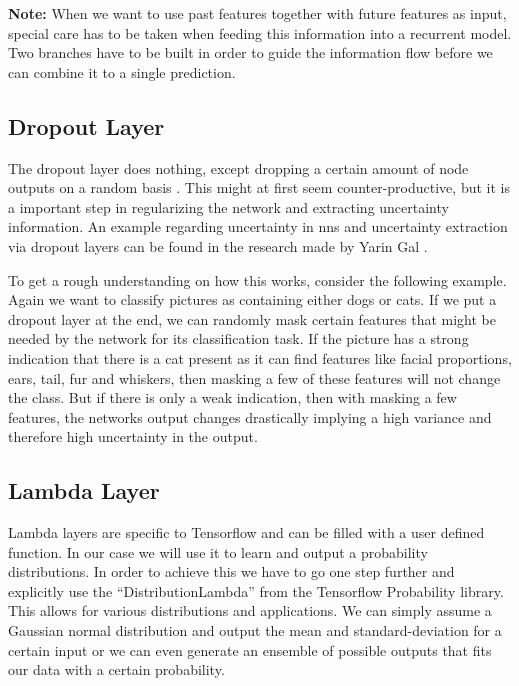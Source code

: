 	\textbf{Note:} When we want to use past features together with future features as input, special care has to be taken when feeding this information into a recurrent model. Two branches have to be built in order to guide the information flow before we can combine it to a single prediction.
	
	\subsection{Dropout Layer}
	The dropout layer does nothing, except dropping a certain amount of node outputs on a random basis \cite[p. 251f]{deep-learning}. This might at first seem counter-productive, but it is a important step in regularizing the network and extracting uncertainty information. %
	An example regarding uncertainty in \acp{nn} and uncertainty extraction via dropout layers can be found in the research made by Yarin Gal \cite{yarin-dropout} \cite{yarin-thesis}.
	
	To get a rough understanding on how this works, consider the following example. Again we want to classify pictures as containing either dogs or cats. If we put a dropout layer at the end, we can randomly mask certain features that might be needed by the network for its classification task. If the picture has a strong indication that there is a cat present as it can find features like facial proportions, ears, tail, fur and whiskers, then masking a few of these features will not change the class. But if there is only a weak indication, then with masking a few features, the networks output changes drastically implying a high variance and therefore high uncertainty in the output.
	
	\subsection{Lambda Layer}
	Lambda layers are specific to Tensorflow and can be filled with a user defined function. In our case we will use it to learn and output a probability distributions. In order to achieve this we have to go one step further and explicitly use the \enquote{DistributionLambda} from the Tensorflow Probability library. This allows for various distributions and applications. We can simply assume a Gaussian normal distribution and output the mean and standard-deviation for a certain input or we can even generate an ensemble of possible outputs that fits our data with a certain probability.

